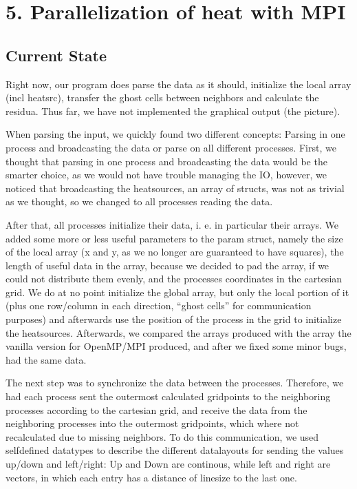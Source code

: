 \section*{5. Parallelization of heat with MPI}
\subsection*{Current State}
Right now, our program does parse the data as it should, initialize the local array (incl heatsrc), transfer the ghost cells between neighbors and calculate the residua. Thus far, we have not implemented the graphical output (the picture).

When parsing the input, we quickly found two different concepts: Parsing in one process and broadcasting the data or parse on all different processes.
First, we thought that parsing in one process and broadcasting the data would be the smarter choice, as we would not have trouble managing the IO, however, we noticed that broadcasting the heatsources, an array of structs, was not as trivial as we thought, so we changed to all processes reading the data.

After that, all processes initialize their data, i. e. in particular their arrays. We added some more or less useful parameters to the param struct, namely the size of the local array (x and y, as we no longer are guaranteed to have squares), the length of useful data in the array, because we decided to pad the array, if we could not distribute them evenly, and the processes coordinates in the cartesian grid. We do at no point initialize the global array, but only the local portion of it (plus one row/column in each direction, ``ghost cells'' for communication purposes) and afterwards use the position of the process in the grid to initialize the heatsources. Afterwards, we compared the arrays produced with the array the vanilla version for OpenMP/MPI produced, and after we fixed some minor bugs, had the same data.

The next step was to synchronize the data between the processes. Therefore, we had each process sent the outermost calculated gridpoints to the neighboring processes according to the cartesian grid, and receive the data from the neighboring processes into the outermost gridpoints, which where not recalculated due to missing neighbors. To do this communication, we used selfdefined datatypes to describe the different datalayouts for sending the values up/down and left/right: Up and Down are continous, while left and right are vectors, in which each entry has a distance of linesize to the last one.

